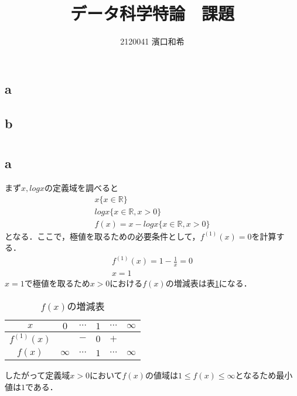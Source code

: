 \documentclass[uplatex,b5j]{jsarticle} %
\begin{document}
\title{データ科学特論　課題}
\author{2120041 濱口和希}
\maketitle                      %

\section{}
\subsection{a}
\subsection{b}


\section{}
\subsection{a}
まず$x, logx$の定義域を調べると
\begin{eqnarray}
    x \{x \in \mathbb{R}\} \\ \nonumber
    logx \{x \in \mathbb{R}, x > 0\} \\ \nonumber
    f(x) = x - logx \{x \in \mathbb{R}, x > 0\}
\end{eqnarray}
となる．ここで，極値を取るための必要条件として，$f^{(1)}(x)=0$を計算する．
\begin{eqnarray}
    f^{(1)}(x)=1-\frac{1}{x}=0 \\ \nonumber
    x = 1
\end{eqnarray}
$x=1$で極値を取るため$x > 0$における$f(x)$の増減表は表\ref{increase_decrease_matrix}になる．
\begin{table}
    \centering
    \caption{$f(x)$の増減表}
    \label{increase_decrease_matrix}
    \begin{tabular}{|c|c|c|c|c|c|}
    \hline
    $x$    & $0$   & $\cdots$ & $1$ & $\cdots$ & $\infty$ \\ \hline
    $f^{(1)}(x)$ &     & $-$   & $0$ & $+$   &     \\ \hline
    $f(x)$  & $\infty$ &  $\cdots$   &  $1$ &  $\cdots$   & $\infty$ \\ \hline
    \end{tabular}
\end{table}
したがって定義域$x>0$において$f(x)$の値域は$1 \leq f(x) \leq \infty$となるため最小値は$1$である．
\end{document}
